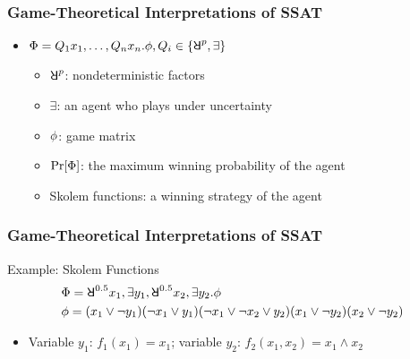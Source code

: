 \begin{frame}
      \frametitle{Game-Theoretical Interpretations of SSAT}
      \begin{itemize}
            \item $\Qf=Q_1 x_1,\ldots,Q_n x_n.\pf,Q_i\in\{\random{p},\exists\}$
                  \begin{itemize}
                        \item $\random{p}$: nondeterministic factors
                        \item $\exists$: an agent who plays under uncertainty
                        \item $\phi$: game matrix
                        \item $\Pr[\Phi]$: the maximum winning probability of the agent
                        \item \alert{Skolem functions}: a winning strategy of the agent
                  \end{itemize}
      \end{itemize}
\end{frame}

\begin{frame}
      \frametitle{Game-Theoretical Interpretations of SSAT}
      \begin{block}{Example: Skolem Functions}
            \abovedisplayskip=0pt
            \belowdisplayskip=0pt
            \begin{align*}
                   & \Qf=\random{0.5} x_1, \exists y_1, \random{0.5} x_2, \exists y_2. \pf \\
                   & \pf=(x_1 \lor \lnot y_1)
                  (\lnot x_1 \lor y_1)
                  (\lnot x_1 \lor \lnot x_2 \lor y_2)
                  (x_1 \lor \lnot y_2)
                  (x_2 \lor \lnot y_2)
            \end{align*}
            \begin{itemize}
                  \item Variable $y_1$: $f_1(x_1)=x_1$; variable $y_2$: $f_2(x_1,x_2)=x_1 \land x_2$
            \end{itemize}
      \end{block}
\end{frame}